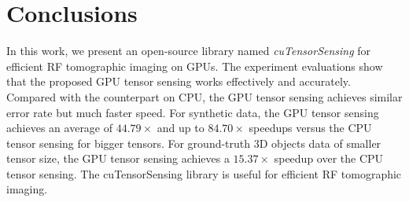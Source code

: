 \documentclass[futureinternet,article,submit,moreauthors,pdftex,10pt,a4paper]{Definitions/mdpi}
\theoremstyle{plain}
\theoremstyle{definition}
\theoremstyle{remark}
\begin{document}
\section{Conclusions}
\label{SEC_CON}
In this work, we present an open-source library named \textit{cuTensorSensing} for efficient RF tomographic imaging on GPUs. The experiment evaluations show that the proposed GPU tensor sensing works effectively and accurately. Compared with the counterpart on CPU, the GPU tensor sensing achieves similar error rate but much faster speed. For synthetic data, the GPU tensor sensing achieves an average of $44.79 \times$ and up to $84.70 \times$ speedups versus the CPU tensor sensing for bigger tensors. For ground-truth 3D objects data of smaller tensor size, the GPU tensor sensing achieves a $15.37 \times$ speedup over the CPU tensor sensing. The cuTensorSensing library is useful for efficient RF tomographic imaging.


\vspace{6pt} 





\end{document}
